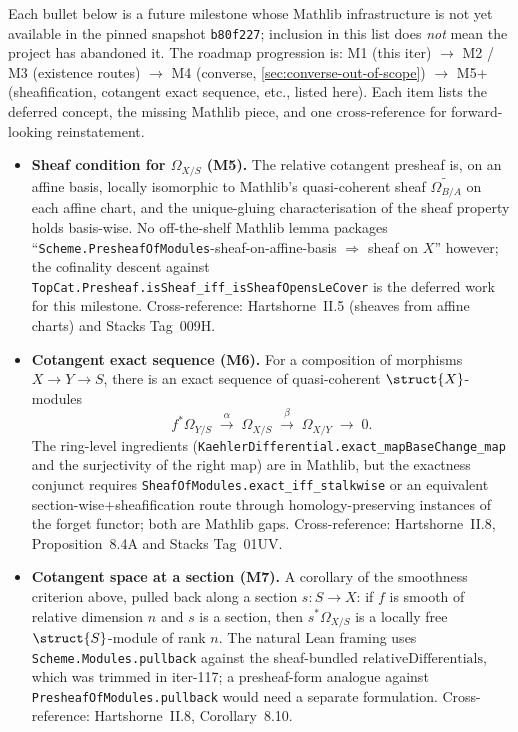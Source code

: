 Each bullet below is a future milestone whose Mathlib infrastructure is not yet available in the pinned snapshot \texttt{b80f227}; inclusion in this list does \emph{not} mean the project has abandoned it. The roadmap progression is: M1 (this iter) \(\to\) M2 / M3 (existence routes) \(\to\) M4 (converse, \cref{sec:converse-out-of-scope}) \(\to\) M5+ (sheafification, cotangent exact sequence, etc., listed here). Each item lists the deferred concept, the missing Mathlib piece, and one cross-reference for forward-looking reinstatement.

\begin{itemize}
  \item \textbf{Sheaf condition for \(\Omega_{X/S}\) (M5).} The relative cotangent presheaf is, on an affine basis, locally isomorphic to Mathlib's quasi-coherent sheaf \(\widetilde{\Omega_{B/A}}\) on each affine chart, and the unique-gluing characterisation of the sheaf property holds basis-wise. No off-the-shelf Mathlib lemma packages ``\texttt{Scheme.PresheafOfModules}-sheaf-on-affine-basis \(\Rightarrow\) sheaf on \(X\)'' however; the cofinality descent against \texttt{TopCat.Presheaf.isSheaf\_iff\_isSheafOpensLeCover} is the deferred work for this milestone. Cross-reference: Hartshorne~II.5 (sheaves from affine charts) and Stacks Tag~009H.

  \item \textbf{Cotangent exact sequence (M6).} For a composition of morphisms \(X \to Y \to S\), there is an exact sequence of quasi-coherent \(\struct{X}\)-modules
  \[
    f^{*}\Omega_{Y/S} \;\xrightarrow{\;\alpha\;}\; \Omega_{X/S} \;\xrightarrow{\;\beta\;}\;
      \Omega_{X/Y} \;\longrightarrow\; 0.
  \]
  The ring-level ingredients (\texttt{KaehlerDifferential.exact\_mapBaseChange\_map} and the surjectivity of the right map) are in Mathlib, but the exactness conjunct requires \texttt{SheafOfModules.exact\_iff\_stalkwise} or an equivalent section-wise+sheafification route through homology-preserving instances of the forget functor; both are Mathlib gaps. Cross-reference: Hartshorne~II.8, Proposition~8.4A and Stacks Tag~01UV.

  \item \textbf{Cotangent space at a section (M7).} A corollary of the smoothness criterion above, pulled back along a section \(s \colon S \to X\): if \(f\) is smooth of relative dimension \(n\) and \(s\) is a section, then \(s^{*}\Omega_{X/S}\) is a locally free \(\struct{S}\)-module of rank \(n\). The natural Lean framing uses \texttt{Scheme.Modules.pullback} against the sheaf-bundled \(\mathrm{relativeDifferentials}\), which was trimmed in iter-117; a presheaf-form analogue against \texttt{PresheafOfModules.pullback} would need a separate formulation. Cross-reference: Hartshorne~II.8, Corollary~8.10.


\end{itemize}
